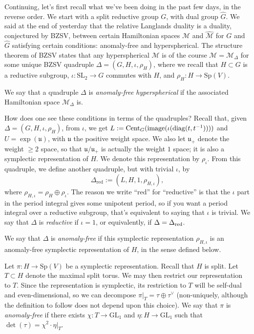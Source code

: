 \documentclass[reqno]{amsart} 
\numberwithin{theorem}{section}
\numberwithin{equation}{section}
\numberwithin{exercise}{section}
\begin{document}
Continuing, let's first recall what we've been doing in the past few days, in the reverse order.  We start with a split reductive group $G$, with dual group $\hat{G}$.  We said at the end of yesterday that the relative Langlands duality is a duality, conjectured by BZSV, between certain Hamiltonian spaces $\mathcal{M}$ and $\hat{\mathcal{M}}$ for $G$ and $\hat{G}$ satisfying certain conditions: anomaly-free and hyperspherical.  The structure theorem of BZSV states that any hyperspherical $\mathcal{M}$ is of the course $\mathcal{M} = \mathcal{M}_\Delta$ for some unique BZSV quadruple $\Delta =(G, H, \iota, \rho_H)$, where we recall that $H \subset G$ is a reductive subgroup, $\iota : \mathrm{SL}_2 \rightarrow G$ commutes with $H$, and $\rho_H : H \rightarrow\mathrm{Sp}(V)$.
\begin{definition}\label{definition:cq6ueb08jo}
  We say that a quadruple $\Delta$ is \emph{anomaly-free hyperspherical} if the associated Hamiltonian space $\mathcal{M}_\Delta$ is.
\end{definition}
How does one see these conditions in terms of the quadruples?  Recall that, given $\Delta =(G, H, \iota, \rho_H)$, from $\iota$, we get $L := \operatorname{Cent}_G(\operatorname{image}(\iota(\operatorname{diag}(t, t^{-1}))))$ and $U = \exp(\mathfrak{u})$, with $\mathfrak{u}$ the positive weight space.  We also let $\mathfrak{u}_+$ denote the weight $\geq 2$ space, so that $\mathfrak{u} / \mathfrak{u}_+$ is actually the weight $1$ space; it is also a symplectic representation of $H$.  We denote this representation by $\rho_\iota$.  From this quadruple, we define another quadruple, but with trivial $\iota$, by
\begin{equation}\label{eq:cq6uefar6y}
  \Delta_{\mathrm{red}} :=(L, H, 1, \rho_{H, \iota}),
\end{equation}
where $\rho_{H, \iota} = \rho_H \oplus \rho_\iota$.  The reason we write ``$\mathrm{red}$'' for ``reductive'' is that the $\iota$ part in the period integral gives some unipotent period, so if you want a period integral over a reductive subgroup, that's equivalent to saying that $\iota$ is trivial.  We say that $\Delta$ is \emph{reductive} if $\iota = 1$, or equivalently, if $\Delta = \Delta_{\operatorname{red}}$.
\begin{definition}\label{definition:cq6ueb2cbs}
  We say that $\Delta$ is \emph{anomaly-free} if this symplectic representation $\rho_{H, \iota}$ is an anomaly-free symplectic representation of $H$, in the sense defined below.
\end{definition}
\begin{definition}\label{definition:cq6ueb0lsb}
  Let $\pi : H \rightarrow\mathrm{Sp}(V)$ be a symplectic representation.  Recall that $H$ is split.  Let $T \subset H$ denote the maximal split torus.  We may then restrict our representation to $T$.  Since the representation is symplectic, its restriction to $T$ will be self-dual and even-dimensional, so we can decompose $\pi |_T = \tau \oplus \tau^\vee$ (non-uniquely, although the definition to follow does not depend upon this choice).  We say that $\pi$ is \emph{anomaly-free} if there exists $\chi : T \rightarrow \mathrm{GL}_1$ and $\eta : H \rightarrow \mathrm{GL}_1$ such that $\det(\tau) = \chi^2 \cdot \eta |_T$.
\end{definition}
\end{document}

